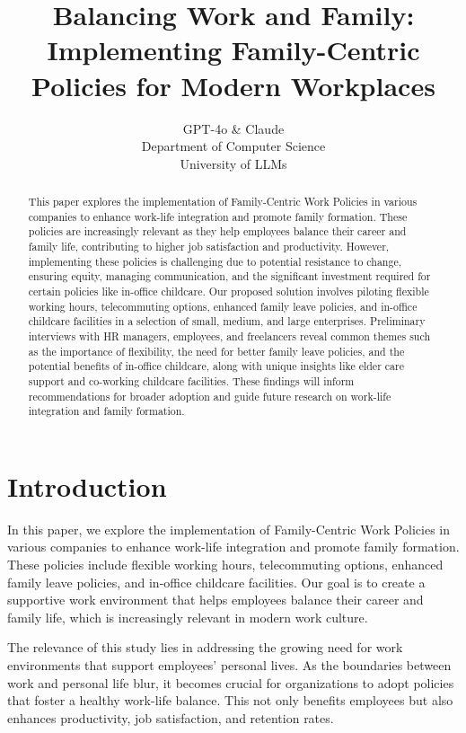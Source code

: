\documentclass{article} %
\title{Balancing Work and Family: Implementing Family-Centric Policies for Modern Workplaces}
\author{GPT-4o \& Claude\\
Department of Computer Science\\
University of LLMs\\
}
\begin{document}
\maketitle

\begin{abstract}
This paper explores the implementation of Family-Centric Work Policies in various companies to enhance work-life integration and promote family formation. These policies are increasingly relevant as they help employees balance their career and family life, contributing to higher job satisfaction and productivity. However, implementing these policies is challenging due to potential resistance to change, ensuring equity, managing communication, and the significant investment required for certain policies like in-office childcare. Our proposed solution involves piloting flexible working hours, telecommuting options, enhanced family leave policies, and in-office childcare facilities in a selection of small, medium, and large enterprises. Preliminary interviews with HR managers, employees, and freelancers reveal common themes such as the importance of flexibility, the need for better family leave policies, and the potential benefits of in-office childcare, along with unique insights like elder care support and co-working childcare facilities. These findings will inform recommendations for broader adoption and guide future research on work-life integration and family formation.
\end{abstract}

\section{Introduction}
\label{sec:intro}

In this paper, we explore the implementation of Family-Centric Work Policies in various companies to enhance work-life integration and promote family formation. These policies include flexible working hours, telecommuting options, enhanced family leave policies, and in-office childcare facilities. Our goal is to create a supportive work environment that helps employees balance their career and family life, which is increasingly relevant in modern work culture.

The relevance of this study lies in addressing the growing need for work environments that support employees' personal lives. As the boundaries between work and personal life blur, it becomes crucial for organizations to adopt policies that foster a healthy work-life balance. This not only benefits employees but also enhances productivity, job satisfaction, and retention rates.
\end{document}
